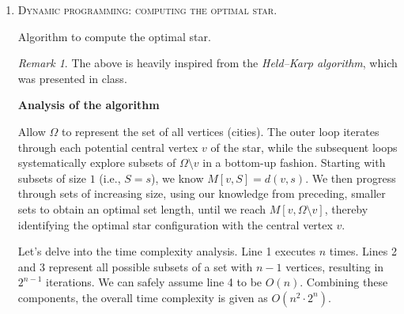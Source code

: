 \documentclass[12pt]{article}
\theoremstyle{definition}
\theoremstyle{remark}
\newtheorem*{remark}{Remark}
\begin{document}
\begin{enumerate}
  \newpage 
  \item \textsc{Dynamic programming: computing the optimal star.}  
  \begin{algorithm}
    \caption{Algorithm to compute the optimal star.}
    \BlankLine
    \BlankLine
{}
  \end{algorithm}

  \begin{remark} 
    The above is heavily inspired from the \textit{Held–Karp algorithm}, which was presented in class. 
  \end{remark}
  \textbf{Analysis of the algorithm}

\hspace{24pt} Allow $\Omega$ to represent the set of all vertices (cities). The outer loop iterates through each potential central vertex $v$ of the star, while the subsequent loops systematically explore subsets of $\Omega\setminus {v}$ in a bottom-up fashion. Starting with subsets of size $1$ (i.e., $S = {s}$), we know $M[v,S] = d(v, s)$. We then progress through sets of increasing size, using our knowledge from preceding, smaller sets to obtain an optimal set length, until we reach $M[v, \Omega\setminus v]$,  thereby identifying the optimal star configuration with the central vertex $v$. 

\hspace{24pt} Let's delve into the time complexity analysis. Line 1 executes $n$ times. Lines 2 and 3 represent all possible subsets of a set with $n-1$ vertices, resulting in $2^{n-1}$ iterations. We can safely assume line 4 to be $O(n)$. Combining these components, the overall time complexity is given as $O(n^2 \cdot 2^n)$.


\end{enumerate}
\end{document}
